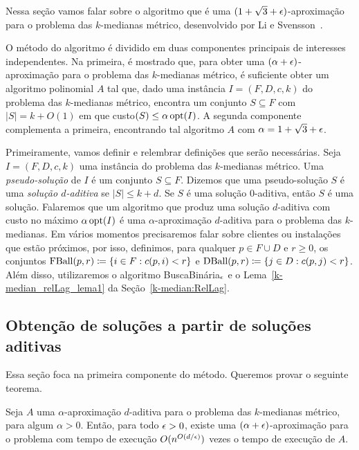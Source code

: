 Nessa seção vamos falar sobre o algoritmo que é uma $(1 + \sqrt{3} + \epsilon)$-aproximação para o problema das $k$-medianas métrico, desenvolvido por Li e Svensson~\cite{li2012}.

O método do algoritmo é dividido em duas componentes principais de interesses independentes. Na primeira, é mostrado que, para obter uma $(\alpha + \epsilon)$-aproximação para o problema das $k$-medianas métrico, é suficiente obter um algoritmo polinomial $A$ tal que, dado uma instância $I = (F,D,c,k)$ do problema das $k$-medianas métrico, encontra um conjunto $S \subseteq F$ com $|S| = k + O(1)$ em que custo$(S) \leq \alpha \, \mathrm{opt}(I) $. A segunda componente complementa a primeira, encontrando tal algoritmo $A$ com ${\alpha =  1 + \sqrt{3} + \epsilon}$.

Primeiramente, vamos definir e relembrar definições que serão necessárias. Seja $I = (F,D,c,k)$ uma instância do problema das $k$-medianas métrico. Uma \emph{pseudo-solução} de $I$ é um conjunto $S \subseteq F$. Dizemos que uma pseudo-solução $S$ é uma \emph{solução $d$-aditiva} se $|S| \leq k + d$. Se $S$ é uma solução $0$-aditiva, então $S$ é uma solução. Falaremos que um algoritmo que produz uma solução $d$-aditiva com custo no máximo $\alpha\, \mathrm{opt}(I)$ é uma $\alpha$-aproximação $d$-aditiva para o problema das $k$-medianas.
Em vários momentos precisaremos falar sobre clientes ou instalações que estão próximos, por isso, definimos, para qualquer $p \in F \cup D$ e $r \geq 0$, os conjuntos ${\text{FBall}(p,r) \coloneq \{i \in F: c(p,i) < r\}}$ e ${\text{DBall}(p,r) \coloneqq \{j \in D: c(p,j) < r\}}$.
Além disso, utilizaremos o algoritmo {\sc BuscaBinária$_\epsilon$} e o Lema~\ref{k-median_relLag_lema1} da Seção~\ref{k-median:RelLag}.

\subsection{Obtenção de soluções a partir de soluções aditivas}

Essa seção foca na primeira componente do método. Queremos provar o seguinte teorema.

\begin{theorem}
    Seja $A$ uma $\alpha$-aproximação $d$-aditiva para o problema das $k$-medianas métrico, para algum $\alpha >0$. Então, para todo $\epsilon > 0$, existe uma $(\alpha + \epsilon)$-aproximação para o problema com tempo de execução $O(n^{O(d/\epsilon)})$ vezes o tempo de execução de $A$.
\end{theorem}

